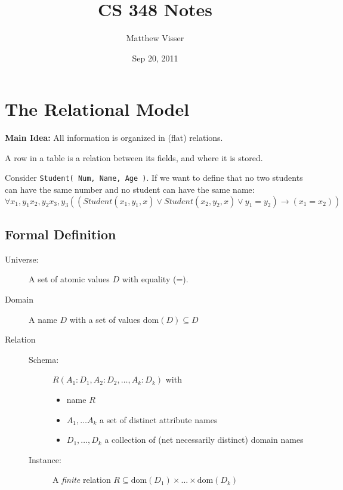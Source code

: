 \documentclass[12pt]{article}
\newcommand{\limplies}{\ensuremath{\to}}
\begin{document}
\title{CS 348 Notes}
\author{Matthew Visser}
\date{Sep 20, 2011}
\maketitle

\section{The Relational Model}

\textbf{Main Idea:}  All information is organized in (flat) relations.

A row in a table is a relation between its fields, and where it is stored.

Consider \texttt{Student( Num, Name, Age )}. If we want to define that no two
students can have the same number and no student can have the same name:
\begin{equation}
    \forall x_1, y_1 x_2, y_2 x_3, y_3 ( ( Student (x_1,y_1,x) \lor
    Student(x_2,y_2,x) \lor y_1 = y_2) \limplies (x_1 = x_2))
\end{equation}


\subsection{Formal Definition}

\begin{description}
    \item[Universe:] A set of atomic values $D$ with equality (=).
    \item[Domain]  A name $D$ with a set of values $\text{dom}(D) \subseteq D$
    \item[Relation] 
        \begin{description}
            \item[Schema:] $R(A_1:D_1,A_2:D_2,\dots,A_k:D_k)$ with
                \begin{itemize}
                    \item name $R$
                    \item $A_1, \dots A_k$ a set of distinct attribute names
                    \item $D_1,\dots,D_k$ a collection of (net necessarily distinct)
                        domain names
                \end{itemize}
            \item[Instance:] A \textit{finite} relation $R\subseteq
                \text{dom}\left( D_1 \right)\times \dots \times \text{dom}\left(
                D_k \right)$
        \end{description}
\end{description}
\end{document}
